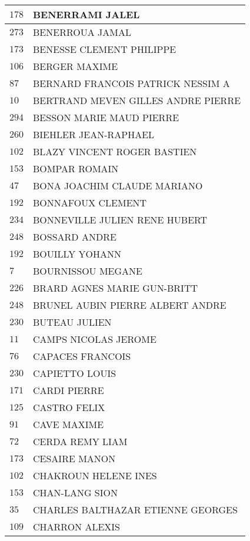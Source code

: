 \begin{xltabular}{\linewidth}{|l|X|}
    \hline
    $178$ & BENERRAMI JALEL \\
    \hline
    $273$ & BENERROUA JAMAL \\
    \hline
    $173$ & BENESSE CLEMENT PHILIPPE \\
    \hline
    $106$ & BERGER MAXIME \\
    \hline
    $87$ & BERNARD FRANCOIS PATRICK NESSIM A \\
    \hline
    $10$ & BERTRAND MEVEN GILLES ANDRE PIERRE \\
    \hline
    $294$ & BESSON MARIE MAUD PIERRE \\
    \hline
    $260$ & BIEHLER JEAN-RAPHAEL \\
    \hline
    $102$ & BLAZY VINCENT ROGER BASTIEN \\
    \hline
    $153$ & BOMPAR ROMAIN \\
    \hline
    $47$ & BONA JOACHIM CLAUDE MARIANO \\
    \hline
    $192$ & BONNAFOUX CLEMENT \\
    \hline
    $234$ & BONNEVILLE JULIEN RENE HUBERT \\
    \hline
    $248$ & BOSSARD ANDRE \\
    \hline
    $192$ & BOUILLY YOHANN \\
    \hline
    $7$ & BOURNISSOU MEGANE \\
    \hline
    $226$ & BRARD AGNES MARIE GUN-BRITT \\
    \hline
    $248$ & BRUNEL AUBIN PIERRE ALBERT ANDRE \\
    \hline
    $230$ & BUTEAU JULIEN \\
    \hline
    $11$ & CAMPS NICOLAS JEROME \\
    \hline
    $76$ & CAPACES FRANCOIS \\
    \hline
    $230$ & CAPIETTO LOUIS \\
    \hline
    $171$ & CARDI PIERRE \\
    \hline
    $125$ & CASTRO FELIX \\
    \hline
    $91$ & CAVE MAXIME \\
    \hline
    $72$ & CERDA REMY LIAM \\
    \hline
    $173$ & CESAIRE MANON \\
    \hline
    $102$ & CHAKROUN HELENE INES \\
    \hline
    $153$ & CHAN-LANG SION \\
    \hline
    $35$ & CHARLES BALTHAZAR ETIENNE GEORGES \\
    \hline
    $109$ & CHARRON ALEXIS \\

\end{xltabular}

